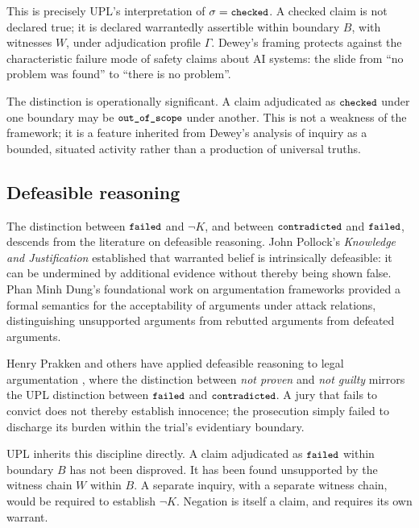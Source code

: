 \documentclass[11pt, a4paper]{article}
\theoremstyle{upldef}
\newcommand{\statuslabel}[1]{\texttt{\small #1}}
\begin{document}
This is precisely UPL's interpretation of $\sigma = \statuslabel{checked}$.
A checked claim is not declared true; it is declared warrantedly
assertible within boundary $B$, with witnesses $W$, under
adjudication profile $\Gamma$. Dewey's framing protects against the
characteristic failure mode of safety claims about AI systems: the
slide from ``no problem was found'' to ``there is no problem''.

The distinction is operationally significant. A claim adjudicated
as $\statuslabel{checked}$ under one boundary may be
$\statuslabel{out\_of\_scope}$ under another. This is not a
weakness of the framework; it is a feature inherited from Dewey's
analysis of inquiry as a bounded, situated activity rather than a
production of universal truths.

\subsection{Defeasible reasoning}
\label{sec:defeasible}

The distinction between $\statuslabel{failed}$ and $\neg K$, and
between $\statuslabel{contradicted}$ and $\statuslabel{failed}$,
descends from the literature on defeasible reasoning. John
Pollock's \emph{Knowledge and Justification} \citep{pollock1974}
established that warranted belief is intrinsically defeasible: it
can be undermined by additional evidence without thereby being
shown false. Phan Minh Dung's foundational work on argumentation
frameworks \citep{dung1995} provided a formal semantics for the
acceptability of arguments under attack relations, distinguishing
unsupported arguments from rebutted arguments from defeated
arguments.

Henry Prakken and others have applied defeasible reasoning to
legal argumentation \citep{prakken2010}, where the distinction
between \emph{not proven} and \emph{not guilty} mirrors the UPL
distinction between $\statuslabel{failed}$ and $\statuslabel{contradicted}$.
A jury that fails to convict does not thereby establish innocence;
the prosecution simply failed to discharge its burden within the
trial's evidentiary boundary.

UPL inherits this discipline directly. A claim adjudicated as
$\statuslabel{failed}$ within boundary $B$ has not been disproved.
It has been found unsupported by the witness chain $W$ within $B$.
A separate inquiry, with a separate witness chain, would be
required to establish $\neg K$. Negation is itself a claim, and
requires its own warrant.
\end{document}
